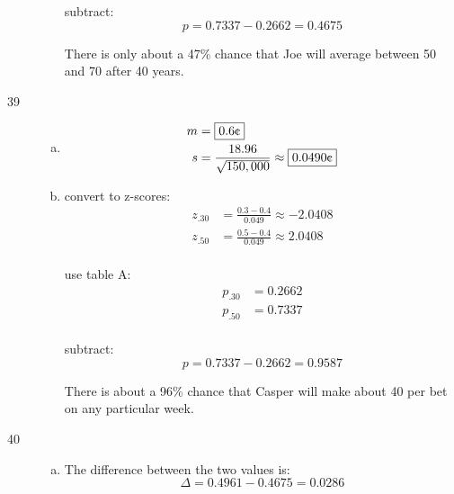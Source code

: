 \documentclass[letterpaper, landscape]{exam}
\newcommand{\cent}{\textcent\xspace}
\begin{document}
\begin{description}
\begin{enumerate}[(a)]
            subtract:
            \[
              p = 0.7337 - 0.2662 = \boxed{ 0.4675 }
            \]

            There is only about a 47\% chance that Joe will average between
            50\cent and 70\cent after 40 years.

        \end{enumerate}

      \item[39]
        \begin{enumerate}[(a)]
          \item 
            \begin{align*}
              m &= \boxed{ 0.6 \text{\cent} } \\
              s &= \frac{18.96}{\sqrt{150,000}} \approx 
                \boxed{ 0.0490 \text{\cent}} \\
            \end{align*}
            
          \item
            convert to z-scores:
            \begin{align*}
              z_{.30} &= \frac{0.3 - 0.4}{0.049} \approx -2.0408 \\ 
              z_{.50} &= \frac{0.5 - 0.4}{0.049} \approx 2.0408 \\
            \end{align*}

            use table A:
            \begin{align*}
              p_{.30} &= 0.2662 \\
              p_{.50} &= 0.7337 \\
            \end{align*}

            subtract:
            \[
              p = 0.7337 - 0.2662 = \boxed{ 0.9587 }
            \]

            There is about a 96\% chance that Casper will make about 40\cent per
            bet on any particular week.

        \end{enumerate}

      \newpage

      \item[40]
        \begin{enumerate}[(a)]
          \item The difference between the two values is:
            \[
              \Delta = 0.4961 - 0.4675 = \boxed{ 0.0286 }
            \]


\end{enumerate}
\end{description}
\end{document}
